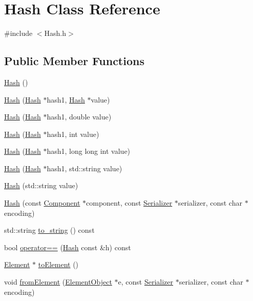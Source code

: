 \hypertarget{classHash}{}\section{Hash Class Reference}
\label{classHash}


{\ttfamily \#include $<$Hash.\+h$>$}

\subsection*{Public Member Functions}
\begin{DoxyCompactItemize}
\item 
\mbox{\hyperlink{classHash_af482880ad75b67a09d2dcb5e86244d80}{Hash}} ()
\item 
\mbox{\hyperlink{classHash_a0e10d81c96b90a36443999a820e29136}{Hash}} (\mbox{\hyperlink{classHash}{Hash}} $\ast$hash1, \mbox{\hyperlink{classHash}{Hash}} $\ast$value)
\item 
\mbox{\hyperlink{classHash_ae324d51c4ee733ef8f7656e6f1afbbd0}{Hash}} (\mbox{\hyperlink{classHash}{Hash}} $\ast$hash1, double value)
\item 
\mbox{\hyperlink{classHash_aa86acb0f09e74c9e6c75adc063539454}{Hash}} (\mbox{\hyperlink{classHash}{Hash}} $\ast$hash1, int value)
\item 
\mbox{\hyperlink{classHash_a523bc61e293e280273dbcd51d6b13905}{Hash}} (\mbox{\hyperlink{classHash}{Hash}} $\ast$hash1, long long int value)
\item 
\mbox{\hyperlink{classHash_af3c5c785c59f0df2549e25a671370452}{Hash}} (\mbox{\hyperlink{classHash}{Hash}} $\ast$hash1, std\+::string value)
\item 
\mbox{\hyperlink{classHash_a529370f2a9baaf470323284364707a88}{Hash}} (std\+::string value)
\item 
\mbox{\hyperlink{classHash_a1d2f0230c2cfe4d6aaab6d9a055faaf5}{Hash}} (const \mbox{\hyperlink{classComponent}{Component}} $\ast$component, const \mbox{\hyperlink{classSerializer}{Serializer}} $\ast$serializer, const char $\ast$encoding)
\item 
std\+::string \mbox{\hyperlink{classHash_ab1c275871d3d81cd38d58dac5c634042}{to\+\_\+string}} () const
\item 
bool \mbox{\hyperlink{classHash_a8aafc6563e964ff47dcbba955b0c28f2}{operator==}} (\mbox{\hyperlink{classHash}{Hash}} const \&h) const
\item 
\mbox{\hyperlink{classElement}{Element}} $\ast$ \mbox{\hyperlink{classHash_a35e01449aedb17a0172837c87986181e}{to\+Element}} ()
\item 
void \mbox{\hyperlink{classHash_a53825b0981f8027244e7bffd84ab2694}{from\+Element}} (\mbox{\hyperlink{classElementObject}{Element\+Object}} $\ast$e, const \mbox{\hyperlink{classSerializer}{Serializer}} $\ast$serializer, const char $\ast$encoding)
\end{DoxyCompactItemize}


